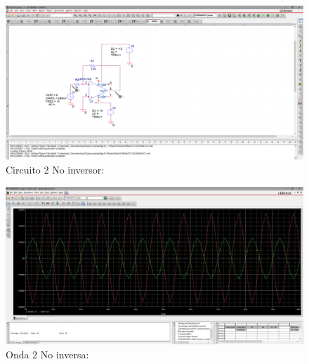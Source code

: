\documentclass[letterpaper]{article}
\begin{document}
\begin{figure}[htbp]
    \centering
    \includegraphics[width=18cm]{IMG/cir(5).png}
    \caption{Circuito 2 No inversor:}
    \label{fig:my_label}
\end{figure}
\begin{figure}[htbp]
    \centering
    \includegraphics[width=18cm]{IMG/ond(1).png}
    \caption{Onda 2 No inversa: }
    \label{fig:my_label}
\end{figure}
\end{document}
